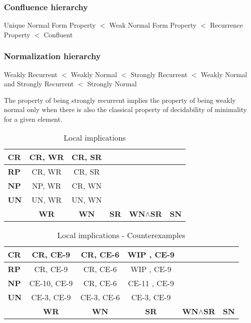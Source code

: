 \documentclass{scrartcl}
\begin{document}
\subsubsection{Confluence hierarchy}

Unique Normal Form Property $<$ Weak Normal Form Property $<$ Recurrence Property $<$ Confluent

\subsubsection{Normalization hierarchy}

Weakly Recurrent $<$ Weakly Normal $<$ Strongly Recurrent $<$ Weakly Normal and Strongly Recurrent $<$ Strongly Normal

The property of being strongly recurrent implies the property of being weakly normal only when there is also the classical property 
of decidability of minimality for a given element. 

\begin{table}[h!]
  \centering
  \caption{Local implications}
  \begin{tabular}{|l|c|c|c|c|c|}     
  \hline
  \textbf{CR} & CR, WR  & CR, SR  &   &   &   \\
  \hline
  \textbf{RP} & CR, WR  & CR, SR  &   &   &   \\
  \hline
  \textbf{NP} & NP, WR  & CR, WN  &   &   &   \\
  \hline
  \textbf{UN} & UN, WR  & UN, WN  &   &   &   \\
  \hline
  & \textbf{WR} & \textbf{WN} & \textbf{SR} & \textbf{WN}$\boldsymbol{\land}$\textbf{SR} & \textbf{SN} \\
  \hline  
  \end{tabular}
\end{table}

\begin{table}[h!]
  \centering
  \caption{Local implications - Counterexamples}
  \begin{tabular}{|l|c|c|c|c|c|}     
  \hline
  \textbf{CR} & CR, CE-9  & CR, CE-6  & WIP , CE-9  &   &   \\
  \hline
  \textbf{RP} & CR, CE-9  & CR, CE-6  & WIP , CE-9 &   &   \\
  \hline
  \textbf{NP} & CE-10, CE-9  & CR, CE-6  & CE-11 , CE-9 &   &   \\
  \hline
  \textbf{UN} & CE-3, CE-9  & CE-3, CE-6  & CE-3, CE-9  &   &   \\
  \hline
  & \textbf{WR} & \textbf{WN} & \textbf{SR} & \textbf{WN}$\boldsymbol{\land}$\textbf{SR} & \textbf{SN} \\
  \hline  
  \end{tabular}
\end{table} 
\end{document}
